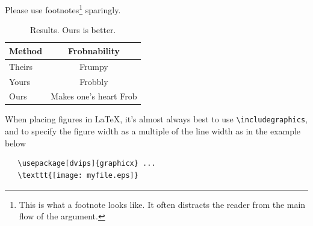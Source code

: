 \documentclass[10pt,twocolumn,letterpaper]{article}
\begin{document}
Please use footnotes\footnote {This is what a footnote looks like.  It
often distracts the reader from the main flow of the argument.} sparingly.

\begin{table}
  \begin{center}
    \begin{tabular}{|l|c|}
      \hline
      Method & Frobnability \\
      \hline\hline
      Theirs & Frumpy \\
      Yours & Frobbly \\
      Ours & Makes one's heart Frob\\
      \hline
    \end{tabular}
  \end{center}
  \caption{Results.   Ours is better.}
\end{table}

When placing figures in \LaTeX, it's almost always best to use
\verb+\includegraphics+, and to specify the  figure width as a multiple of
the line width as in the example below
{\small\begin{verbatim}
   \usepackage[dvips]{graphicx} ...
   \texttt{[image: myfile.eps]}
\end{verbatim}
}


{\small


}
\end{document}
